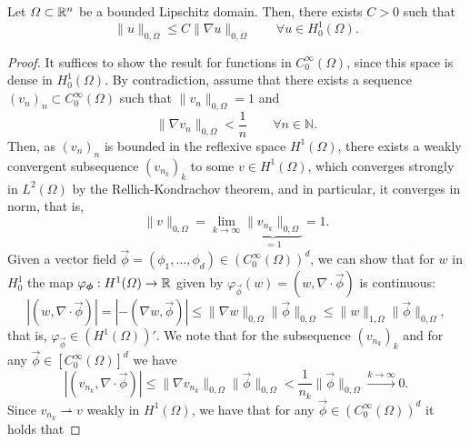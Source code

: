 \begin{lemma}\label{lemma:poincare-inequality}
    Let $\Omega\subset \mathbb{R}^n$ be a bounded Lipschitz domain. Then, there exists $C>0$ such that
    \begin{equation}\label{eq:poincare-inequality}
        \|u\|_{0,\Omega} \leq C\|\nabla u\|_{0,\Omega} \qquad \forall u\in H^1_0(\Omega).
    \end{equation}
    \begin{proof}
        It suffices to show the result for functions in $C_0^\infty(\Omega)$, since this space is dense in $H_0^1(\Omega)$. By contradiction, assume that there exists a sequence $(v_n)_n\subset C_0^\infty(\Omega)$ such that $\|v_n\|_{0,\Omega}=1$ and 
        \begin{equation*}
            \|\nabla v_n\|_{0,\Omega} < \frac{1}{n} \qquad \forall n\in \mathbb{N}.
        \end{equation*}
        Then, as $(v_n)_n$ is bounded in the reflexive space $H^1(\Omega)$, there exists a weakly convergent subsequence $(v_{n_k})_k$ to some $v\in H^1(\Omega)$, which converges strongly in $L^2(\Omega)$ by the Rellich-Kondrachov theorem, and in particular, it converges in norm, that is,
        \begin{equation*}
            \|v\|_{0,\Omega} = \lim_{k\to\infty} \underbrace{\|v_{n_k}\|_{0,\Omega}}_{=1} = 1.
        \end{equation*}
        Given a vector field $\vec\phi = (\phi_1,\dots,\phi_d)\in (C_0^\infty(\Omega))^d$, we can show that for $w$ in $H_0^1$ the map $\varphi_{\vec{\phi}}:H^1(\Omega)\to\R$ given by $\varphi_{\vec{\phi}}(w) = (w, \nabla\cdot \vec \phi)$ is continuous:
        \begin{equation*}
            |(w,\nabla\cdot\vec\phi)| = |-(\nabla w, \vec\phi)| \leq \|\nabla w\|_{0,\Omega}\|\vec\phi\|_{0,\Omega} \leq \|w\|_{1,\Omega}\|\vec\phi\|_{0,\Omega},
        \end{equation*}
        that is, $\varphi_{\vec{\phi}} \in (H^1(\Omega))'$. We note that for the subsequence $(v_{n_k})_k$ and for any $\vec\phi \in [C_0^\infty(\Omega)]^d$ we have 
        \begin{equation*}
            |(v_{n_k},\nabla\cdot\vec\phi)| \leq \|\nabla v_{n_k}\|_{0,\Omega}\|\vec\phi\|_{0,\Omega} < \frac{1}{n_k}\|\vec\phi\|_{0,\Omega}\overset{k\to\infty}{\longrightarrow} 0.
        \end{equation*}
        Since $v_{n_k} \rightharpoonup v$ weakly in $H^1(\Omega)$, we have that for any $\vec\phi \in (C_0^\infty(\Omega))^d$ it holds that

\end{proof}
\end{lemma}
